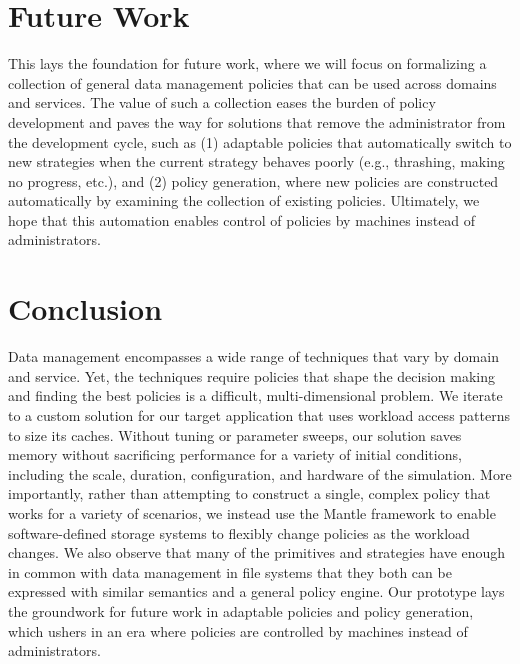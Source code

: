 \section{Future Work}

This lays the foundation for future work, where we will focus on formalizing a
collection of general data management policies that can be used across domains
and services. The value of such a collection eases the burden of policy
development and paves the way for solutions that remove the administrator from
the development cycle, such as (1) adaptable policies that automatically switch
to new strategies when the current strategy behaves poorly ({e.g.}, thrashing,
making no progress, etc.), and (2) policy generation, where new policies are
constructed automatically by examining the collection of existing policies.
Ultimately, we hope that this automation enables control of policies by
machines instead of administrators. 

\section{Conclusion}

Data management encompasses a wide range of techniques that vary by domain and
service. Yet, the techniques require policies that shape the decision making
and finding the best policies is a difficult, multi-dimensional problem.  We
iterate to a custom solution for our target application that uses workload
access patterns to size its caches. Without tuning or parameter sweeps, our
solution saves memory without sacrificing performance for a variety of initial
conditions, including the scale, duration, configuration, and hardware of the
simulation. More importantly, rather than attempting to construct a single,
complex policy that works for a variety of scenarios, we instead use the Mantle
framework to enable software-defined storage systems to flexibly change
policies as the workload changes.  We also observe that many of the primitives
and strategies have enough in common with data management in file systems that
they both can be expressed with similar semantics and a general policy engine.
Our prototype lays the groundwork for future work in adaptable policies and
policy generation, which ushers in an era where policies are controlled by
machines instead of administrators.
